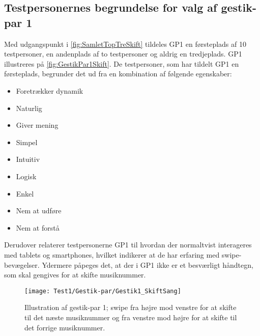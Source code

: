 \subsection{Testpersonernes begrundelse for valg af gestik-par 1}
\label{TestresultaterValgAfGestikkerBegrundelseGP1Skift}
%
Med udgangspunkt i \autoref{fig:SamletTopTreSkift} tildeles GP1 en førsteplads af 10 testpersoner, en andenplads af to testpersoner og aldrig en tredjeplads. GP1 illustreres på \autoref{fig:GestikPar1Skift}. De testpersoner, som har tildelt GP1 en førsteplads, begrunder det ud fra en kombination af følgende egenskaber: 
%
\begin{multicols}{3}
    \begin{itemize}
        \item Foretrækker dynamik
        \item Naturlig
        \item Giver mening
        \item Simpel
        \item Intuitiv
        \item Logisk
        \item Enkel
        \item Nem at udføre
        \item Nem at forstå
\end{itemize}
\end{multicols}
\noindent
%
Derudover relaterer testpersonerne GP1 til hvordan der normaltvist interageres med tablets og smartphones, hvilket indikerer at de har erfaring med swipe-bevægelser. Ydermere påpeges det, at der i GP1 ikke er et besværligt håndtegn, som skal gengives for at skifte musiknummer.
%
\begin{figure}[H]
	\centering
	\texttt{[image: Test1/Gestik-par/Gestik1\_SkiftSang]}
	\caption{Illustration af gestik-par 1; swipe fra højre mod venstre for at skifte til det næste musiknummer og fra venstre mod højre for at skifte til det forrige musiknummer.}
	\label{fig:GestikPar1Skift}
\end{figure}
\noindent
%
